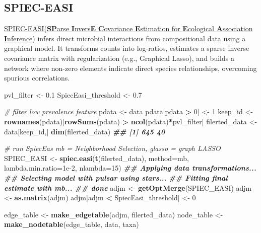 \documentclass[
]{article}
\newenvironment{Shaded}{\begin{snugshade}}{\end{snugshade}}
\newcommand{\AttributeTok}[1]{\textcolor[rgb]{0.13,0.29,0.53}{#1}}
\newcommand{\CommentTok}[1]{\textcolor[rgb]{0.56,0.35,0.01}{\textit{#1}}}
\newcommand{\DecValTok}[1]{\textcolor[rgb]{0.00,0.00,0.81}{#1}}
\newcommand{\DocumentationTok}[1]{\textcolor[rgb]{0.56,0.35,0.01}{\textbf{\textit{#1}}}}
\newcommand{\FloatTok}[1]{\textcolor[rgb]{0.00,0.00,0.81}{#1}}
\newcommand{\FunctionTok}[1]{\textcolor[rgb]{0.13,0.29,0.53}{\textbf{#1}}}
\newcommand{\NormalTok}[1]{#1}
\newcommand{\OtherTok}[1]{\textcolor[rgb]{0.56,0.35,0.01}{#1}}
\newcommand{\SpecialCharTok}[1]{\textcolor[rgb]{0.81,0.36,0.00}{\textbf{#1}}}
\newcommand{\StringTok}[1]{\textcolor[rgb]{0.31,0.60,0.02}{#1}}
\begin{document}
\hypertarget{spiec-easi}{%
\subsection{SPIEC-EASI}\label{spiec-easi}}

\href{https://journals.plos.org/ploscompbiol/article?id=10.1371/journal.pcbi.1004226}{SPIEC-EASI(\textbf{SP}arse
\textbf{I}nvers\textbf{E} \textbf{C}ovariance \textbf{E}stimation for
\textbf{E}cological \textbf{A}ssociation \textbf{I}nference)} infers
direct microbial interactions from compositional data using a graphical
model. It transforms counts into log-ratios, estimates a sparse inverse
covariance matrix with regularization (e.g., Graphical Lasso), and
builds a network where non-zero elements indicate direct species
relationships, overcoming spurious correlations.

\begin{Shaded}
\begin{Highlighting}[]
\NormalTok{pvl\_filter }\OtherTok{\textless{}{-}} \FloatTok{0.1}
\NormalTok{SpiecEasi\_threshold }\OtherTok{\textless{}{-}} \FloatTok{0.7}

\CommentTok{\# filter low prevalence feature}
\NormalTok{pdata }\OtherTok{\textless{}{-}}\NormalTok{ data}
\NormalTok{pdata[pdata }\SpecialCharTok{\textgreater{}} \DecValTok{0}\NormalTok{] }\OtherTok{\textless{}{-}} \DecValTok{1}
\NormalTok{keep\_id }\OtherTok{\textless{}{-}} \FunctionTok{rownames}\NormalTok{(pdata)[}\FunctionTok{rowSums}\NormalTok{(pdata) }\SpecialCharTok{\textgreater{}} \FunctionTok{ncol}\NormalTok{(pdata)}\SpecialCharTok{*}\NormalTok{pvl\_filter]}
\NormalTok{filerted\_data }\OtherTok{\textless{}{-}}\NormalTok{ data[keep\_id,]}
\FunctionTok{dim}\NormalTok{(filerted\_data)}
\DocumentationTok{\#\# [1] 645  40}

\CommentTok{\# run SpiecEas mb = Neighborhood Selection, glasso = graph LASSO}
\NormalTok{SPIEC\_EASI }\OtherTok{\textless{}{-}} \FunctionTok{spiec.easi}\NormalTok{(}\FunctionTok{t}\NormalTok{(filerted\_data), }\AttributeTok{method=}\StringTok{\textquotesingle{}mb\textquotesingle{}}\NormalTok{, }\AttributeTok{lambda.min.ratio=}\FloatTok{1e{-}2}\NormalTok{, }\AttributeTok{nlambda=}\DecValTok{15}\NormalTok{)}
\DocumentationTok{\#\# Applying data transformations...}
\DocumentationTok{\#\# Selecting model with pulsar using stars...}
\DocumentationTok{\#\# Fitting final estimate with mb...}
\DocumentationTok{\#\# done}
\NormalTok{adjm }\OtherTok{\textless{}{-}} \FunctionTok{getOptMerge}\NormalTok{(SPIEC\_EASI)}
\NormalTok{adjm }\OtherTok{\textless{}{-}} \FunctionTok{as.matrix}\NormalTok{(adjm)}
\NormalTok{adjm[adjm }\SpecialCharTok{\textless{}}\NormalTok{ SpiecEasi\_threshold] }\OtherTok{\textless{}{-}} \DecValTok{0}

\NormalTok{edge\_table }\OtherTok{\textless{}{-}} \FunctionTok{make\_edgetable}\NormalTok{(adjm, filerted\_data)}
\NormalTok{node\_table }\OtherTok{\textless{}{-}} \FunctionTok{make\_nodetable}\NormalTok{(edge\_table, data, taxa)}
\end{Highlighting}
\end{Shaded}
\end{document}
